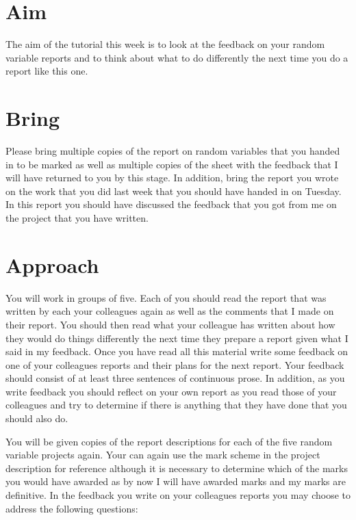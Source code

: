 \documentclass[a4paper]{article}
\begin{document}
\section{Aim}

The aim of the tutorial this week is to look at the feedback on your random variable reports and to think about what to do differently the next time you do a report like this one.

\section{Bring}

Please bring multiple copies of the report on random variables that you handed in to be marked as well as multiple copies of the sheet with the feedback that I will have returned to you by this 
stage.  In addition, bring the report you wrote on the work that you did last week that you should have handed in on Tuesday.  In this report you should have discussed the feedback that you got from 
me on the project that you have written.

\section{Approach}

You will work in groups of five.  Each of you should read the report that was written by each your colleagues again as well as the comments that I made on their report. You should then read what your 
colleague has written about how they would do things differently the next time they prepare a report given what I said in my feedback.  Once you have read all this material write some 
feedback on one of your colleagues reports and their plans for the next report.  Your feedback should consist of at least three sentences of continuous prose.  In addition, as you write feedback you 
should reflect on your own report as you read those of your colleagues and try to determine if there is anything that they have done that you should also do.  

You will be given copies of the report descriptions for each of the five random variable projects again.  Your can again use the mark scheme in the project description for reference although it is 
necessary to determine which of the marks you would have awarded as by now I will have awarded marks and my marks are definitive.  In the feedback you write on your colleagues reports you may choose 
to address the following questions:
\end{document}
